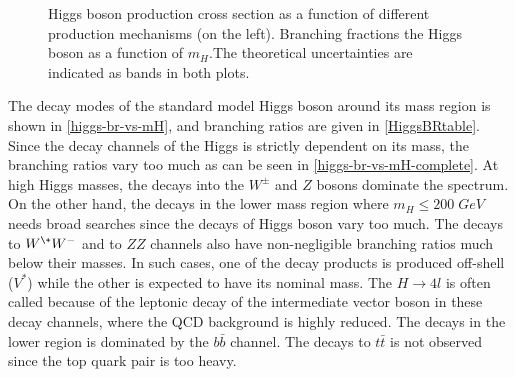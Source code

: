 \begin{figure}[ht]
\begin{subfigure}[b]{0.475\textwidth}
            \vspace{-0.75cm}
            \label{higgs-br-vs-mH}
        \end{subfigure}
        \caption[Higgs boson production cross section as a function of different production mechanisms (on the left). Branching fractions the Higgs boson as a function of $m_H$ .The theoretical uncertainties are indicated as bands in both plots.]
        {\small Higgs boson production cross section as a function of different production mechanisms\cite{higg-phen-3} (on the left). Branching fractions the Higgs boson as a function of $m_H$\cite{higgs-br-vs-mH}.The theoretical uncertainties are indicated as bands in both plots.}
\end{figure}

The decay modes of the standard model Higgs boson around its mass region is shown in \autoref{higgs-br-vs-mH}, and branching ratios are given in \autoref{HiggsBRtable}. Since the decay channels of the Higgs is strictly dependent on its mass, the branching ratios vary too much as can be seen in \autoref{higgs-br-vs-mH-complete}. At high Higgs masses, the decays into the $W^\pm$ and $Z$ bosons dominate the spectrum.  On the other hand, the decays in the lower mass region where $m_H \le 200\; GeV$ needs broad searches since the decays of Higgs boson vary too much. The decays to $W^\+W^-$ and to $ZZ$ channels also have non-negligible branching ratios much below their masses. In such cases, one of the decay products is produced off-shell ($V^*$) while the other is expected to have its nominal mass. The $H \rightarrow 4l$ is often called   because of the leptonic decay of the intermediate vector boson in these decay channels, where the QCD background is highly reduced. The decays in the lower region is dominated by the $b\bar b$ channel. The decays to $t\bar t$ is not observed since the top quark pair is too heavy.

